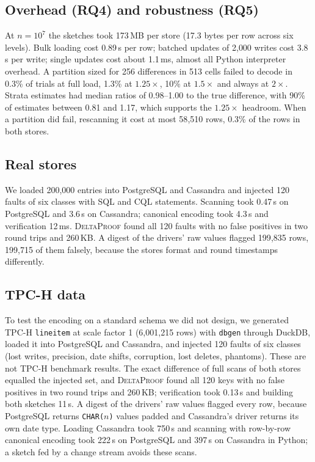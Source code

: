 \documentclass[conference]{IEEEtran}
\newcommand{\sys}{\textsc{DeltaProof}}
\begin{document}
\subsection{Overhead (RQ4) and robustness (RQ5)}
At $n=10^7$ the sketches took 173\,MB per store (17.3 bytes per row across six levels). Bulk loading cost 0.89\,\textmu s per row; batched updates of 2{,}000 writes cost 3.8\,\textmu s per write; single updates cost about 1.1\,ms, almost all Python interpreter overhead. A partition sized for 256 differences in 513 cells failed to decode in 0.3\% of trials at full load, 1.3\% at $1.25\times$, 10\% at $1.5\times$ and always at $2\times$. Strata estimates had median ratios of 0.98--1.00 to the true difference, with 90\% of estimates between 0.81 and 1.17, which supports the $1.25\times$ headroom. When a partition did fail, rescanning it cost at most 58{,}510 rows, 0.3\% of the rows in both stores.

\subsection{Real stores}
We loaded 200{,}000 entries into PostgreSQL and Cassandra and injected 120 faults of six classes with SQL and CQL statements. Scanning took 0.47\,s on PostgreSQL and 3.6\,s on Cassandra; canonical encoding took 4.3\,s and verification 12\,ms. \sys{} found all 120 faults with no false positives in two round trips and 260\,KB. A digest of the drivers' raw values flagged 199{,}835 rows, 199{,}715 of them falsely, because the stores format and round timestamps differently.

\subsection{TPC-H data}
To test the encoding on a standard schema we did not design, we generated TPC-H \texttt{lineitem} at scale factor 1 (6{,}001{,}215 rows) with \texttt{dbgen} through DuckDB, loaded it into PostgreSQL and Cassandra, and injected 120 faults of six classes (lost writes, precision, date shifts, corruption, lost deletes, phantoms). These are not TPC-H benchmark results. The exact difference of full scans of both stores equalled the injected set, and \sys{} found all 120 keys with no false positives in two round trips and 260\,KB; verification took 0.13\,s and building both sketches 11\,s. A digest of the drivers' raw values flagged every row, because PostgreSQL returns \texttt{CHAR($n$)} values padded and Cassandra's driver returns its own date type. Loading Cassandra took 750\,s and scanning with row-by-row canonical encoding took 222\,s on PostgreSQL and 397\,s on Cassandra in Python; a sketch fed by a change stream avoids these scans.
\end{document}
